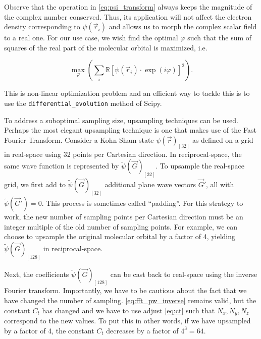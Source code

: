 Observe that the operation in \cref{eq:psi_transform} always keeps the magnitude of the complex number conserved. Thus, its application will not affect the electron density corresponding to $\psi(\vec{r}_{i})$ and allows us to morph the complex scalar field to a real one. For our use case, we wish find the optimal $\varphi$ such that the sum of squares of the real part of the molecular orbital is maximized, i.e.

\begin{equation}
    \max_\varphi \left(\sum_{i}\mathbb{R}\left[ \psi(\vec{r}_{i}) \cdot \exp \left(i \varphi \right)\right]^{2} \right).
\end{equation}

This is non-linear optimization problem and an efficient way to tackle this is to use the \texttt{differential\_evolution} method of Scipy.\cite{differential_evolution}

To address a suboptimal sampling size, upsampling techniques can be used. Perhaps the most elegant upsampling technique is one that makes use of the Fast Fourier Transform. Consider a Kohn-Sham state $\psi(\vec{r})_{[32]}$ as defined on a grid in real-space using 32 points per Cartesian direction. In reciprocal-space, the same wave function is represented by $\tilde{\psi}(\vec{G})_{[32]}$. To upsample the real-space grid, we first add to $\tilde{\psi}(\vec{G})_{[32]}$ additional plane wave vectors $\vec{G}\prime$, all with $\tilde{\psi}(\vec{G}\prime) = 0$. This process is sometimes called ``padding''. For this strategy to work, the new number of sampling points per Cartesian direction must be an integer multiple of the old number of sampling points. For example, we can choose to upsample the original molecular orbital by a factor of 4, yielding $\tilde{\psi}(\vec{G})_{[128]}$ in reciprocal-space.

Next, the coefficients $\tilde{\psi}(\vec{G})_{[128]}$ can be cast back to real-space using the inverse Fourier transform. Importantly, we have to be cautious about the fact that we have changed the number of sampling. \cref{eq:fft_pw_inverse} remains valid, but the constant $C_{t}$ has changed and we have to use adjust \cref{eq:ct} such that $N_{x},N_{y},N_{z}$ correspond to the new values. To put this in other words, if we have upsampled by a factor of 4, the constant $C_{t}$ decreases by a factor of $4^{3}=64$.